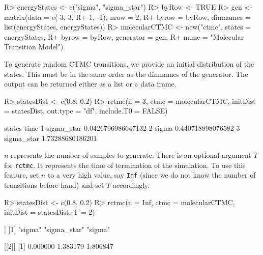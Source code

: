\documentclass[
  nojss]{jss}
\begin{document}
\begin{CodeChunk}

\begin{CodeInput}
R> energyStates <- c("sigma", "sigma_star")
R> byRow <- TRUE
R> gen <- matrix(data = c(-3, 3,
R+                        1, -1), nrow = 2,
R+               byrow = byRow, dimnames = list(energyStates, energyStates))
R> molecularCTMC <- new("ctmc", states = energyStates, 
R+                  byrow = byRow, generator = gen, 
R+                  name = "Molecular Transition Model")      
\end{CodeInput}
\end{CodeChunk}

To generate random CTMC transitions, we provide an initial distribution of the states. This must be in the same order as the dimnames of the generator. The output can be returned either as a list or a data frame.

\begin{CodeChunk}

\begin{CodeInput}
R> statesDist <- c(0.8, 0.2)
R> rctmc(n = 3, ctmc = molecularCTMC, initDist = statesDist, out.type = "df", include.T0 = FALSE)
\end{CodeInput}

\begin{CodeOutput}
      states               time
1 sigma_star 0.0426796986647132
2      sigma  0.440718898076582
3 sigma_star   1.73288680186201
\end{CodeOutput}
\end{CodeChunk}

\(n\) represents the number of samples to generate. There is an optional argument \(T\) for \texttt{rctmc}. It represents the time of termination of the simulation. To use this feature, set \(n\) to a very high value, say \texttt{Inf} (since we do not know the number of transitions before hand) and set \(T\) accordingly.

\begin{CodeChunk}

\begin{CodeInput}
R> statesDist <- c(0.8, 0.2)
R> rctmc(n = Inf, ctmc = molecularCTMC, initDist = statesDist, T = 2)
\end{CodeInput}

\begin{CodeOutput}
[[1]]
[1] "sigma"      "sigma_star" "sigma"     

[[2]]
[1] 0.000000 1.383179 1.806847
\end{CodeOutput}
\end{CodeChunk}
\end{document}
